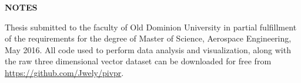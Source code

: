 \begin{center}
    \Large
    \textbf{NOTES}
    \vspace{0.4cm}

\end{center}

Thesis submitted to the faculty of Old Dominion University in partial 
fulfillment of the requirements for the degree of Master of Science, Aerospace 
Engineering, May 2016. All code used to perform data analysis and 
visualization, along with the raw three dimensional vector dataset can be 
downloaded for free from \url{https://github.com/Jwely/pivpr}.

